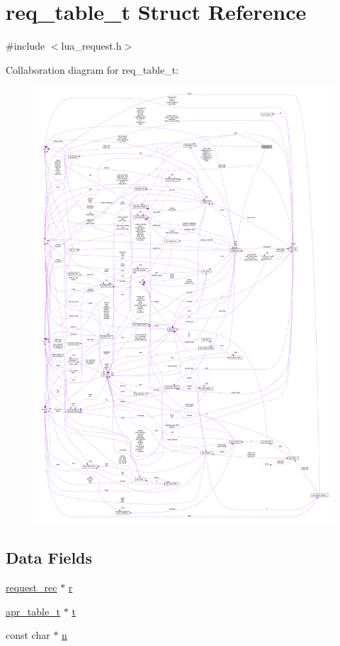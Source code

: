 \hypertarget{structreq__table__t}{}\section{req\+\_\+table\+\_\+t Struct Reference}
\label{structreq__table__t}


{\ttfamily \#include $<$lua\+\_\+request.\+h$>$}



Collaboration diagram for req\+\_\+table\+\_\+t\+:
\nopagebreak
\begin{figure}[H]
\begin{center}
\leavevmode
\includegraphics[width=350pt]{structreq__table__t__coll__graph}
\end{center}
\end{figure}
\subsection*{Data Fields}
\begin{DoxyCompactItemize}
\item 
\hyperlink{structrequest__rec}{request\+\_\+rec} $\ast$ \hyperlink{structreq__table__t_a6e3dbb50859ac07a590b0b0ccc9a6e91}{r}
\item 
\hyperlink{structapr__table__t}{apr\+\_\+table\+\_\+t} $\ast$ \hyperlink{structreq__table__t_a7a4d025a7e0edc9fb3c11fe64ad05817}{t}
\item 
const char $\ast$ \hyperlink{structreq__table__t_a0e23b1ff47dd10e67523eed26ddde26d}{n}
\end{DoxyCompactItemize}


